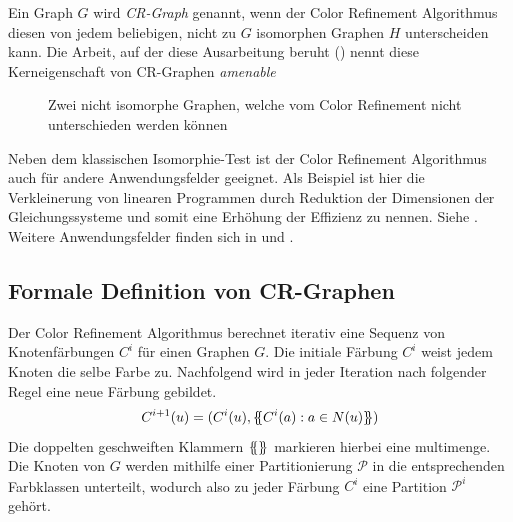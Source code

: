\begin{Definition}
	Ein Graph $G$ wird \emph{CR-Graph} genannt, wenn der Color Refinement Algorithmus diesen von jedem beliebigen, nicht zu $G$ isomorphen Graphen $H$ unterscheiden kann. Die Arbeit, auf der diese Ausarbeitung beruht (\cite{Arvind2015}) nennt diese Kerneigenschaft von CR-Graphen \emph{amenable}
	\label{def:cr-graph1}
\end{Definition}

\begin{figure}[h]
	\centering
	\caption{Zwei nicht isomorphe Graphen, welche vom Color Refinement nicht unterschieden werden können}
	\label{fig:nicht_isomorphe_graphen}
\end{figure}

Neben dem klassischen Isomorphie-Test ist der Color Refinement Algorithmus auch für andere Anwendungsfelder geeignet. Als Beispiel ist hier die Verkleinerung von linearen Programmen durch Reduktion der Dimensionen der Gleichungssysteme und somit eine Erhöhung der Effizienz zu nennen. Siehe \cite{Grohe2014}. Weitere Anwendungsfelder finden sich in \cite{shervashidze2011weisfeiler} und \cite{kersting2014power}.

\subsection{Formale Definition von CR-Graphen}
Der Color Refinement Algorithmus berechnet iterativ eine Sequenz von Knotenfärbungen $C^i$ für einen Graphen $G$. Die initiale Färbung $C^i$ weist jedem Knoten die selbe Farbe zu. Nachfolgend wird in jeder Iteration nach folgender Regel eine neue Färbung gebildet.
\begin{equation}
C^{i+1}(u)=(C^i(u),\{\mskip-5mu\{ C^i(a):a\in N(u)\}\mskip-5mu\} )
\label{eq:1}
\end{equation}
Die doppelten geschweiften Klammern $\{\mskip-5mu\{ \}\mskip-5mu\} $ markieren hierbei eine \gls{multimenge}. Die Knoten von $G$ werden mithilfe einer Partitionierung $\mathcal{P}$ in die entsprechenden Farbklassen unterteilt, wodurch also zu jeder Färbung $C^i$ eine Partition $\mathcal{P}^i$ gehört.

